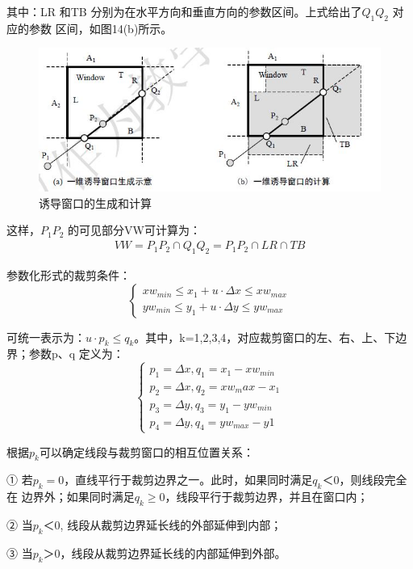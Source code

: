 \documentclass[a4paper,UTF8]{article}
\theoremstyle{definition}
\begin{document}
其中：LR 和TB 分别为在水平方向和垂直方向的参数区间。上式给出了$Q_1Q_2$ 对应的参数
区间，如图14(b)所示。
\begin{figure}[h]

    \centering
    \includegraphics[width = .5\textwidth]{14.jpg}
    \caption{诱导窗口的生成和计算}
    \label{fig:label14}
\end{figure}
这样，$P_1P_2$ 的可见部分VW可计算为：
\begin{align}
    VW= P_1P_2 \cap Q_1Q_2=P_1P_2 \cap LR \cap TB
\end{align}

参数化形式的裁剪条件：
\begin{equation}
    \left\{
                 \begin{array}{lr}
                 xw_{min} \leq x_1 + u \cdot \Delta x \leq xw_{max}\\
                 yw_{min} \leq y_1 + u \cdot \Delta y \leq yw_{max} 
                 \end{array}
    \right.
\end{equation}

可统一表示为：$u \cdot p_k \leq q_k$。其中，k=1,2,3,4，对应裁剪窗口的左、右、上、下边
界；参数p、q 定义为：
\begin{equation}
    \left\{
                 \begin{array}{lr}
                 p_1 = \Delta x,q_1 = x_1 - xw_{min}\\
                 p_2 = \Delta x,q_2 = xw_max - x_1\\
                 p_3 = \Delta y,q_3 = y_1 - yw_{min}\\
                 p_4 = \Delta y,q_4 = yw_{max} - y1 
                 \end{array}
    \right.
\end{equation}

根据$p_k$可以确定线段与裁剪窗口的相互位置关系：

① 若$p_k=0$，直线平行于裁剪边界之一。此时，如果同时满足$q_k＜0$，则线段完全在
边界外；如果同时满足$q_k \geq 0$，线段平行于裁剪边界，并且在窗口内；

② 当$p_k＜0$, 线段从裁剪边界延长线的外部延伸到内部；

③ 当$p_k＞0$，线段从裁剪边界延长线的内部延伸到外部。
\end{document}
